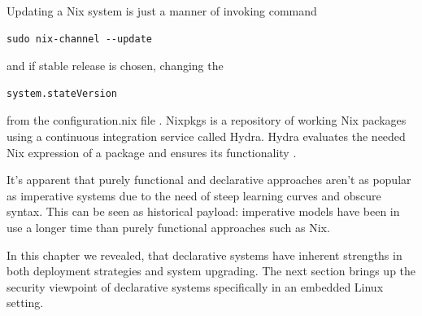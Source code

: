 Updating a Nix system is just a manner of invoking command

\begin{lstlisting}
sudo nix-channel --update
\end{lstlisting}
and if stable release is chosen, changing the
\begin{lstlisting}
system.stateVersion
\end{lstlisting}
from the configuration.nix file \cite{nixosNixOSManual}. Nixpkgs is a
repository of working Nix packages using a continuous integration
service called Hydra. Hydra evaluates the needed Nix expression of a
package and ensures its functionality \cite{nixosNixOSManual}.

It's apparent that purely functional and declarative approaches aren't as popular
as imperative systems due to the need of steep learning curves and
obscure syntax. This can be seen as historical payload: imperative
models have been in use a longer time than purely functional
approaches such as Nix.

In this chapter we revealed, that declarative systems have inherent
strengths in both deployment strategies and system upgrading. The next
section brings up the security viewpoint of declarative systems
specifically in an embedded Linux setting.
